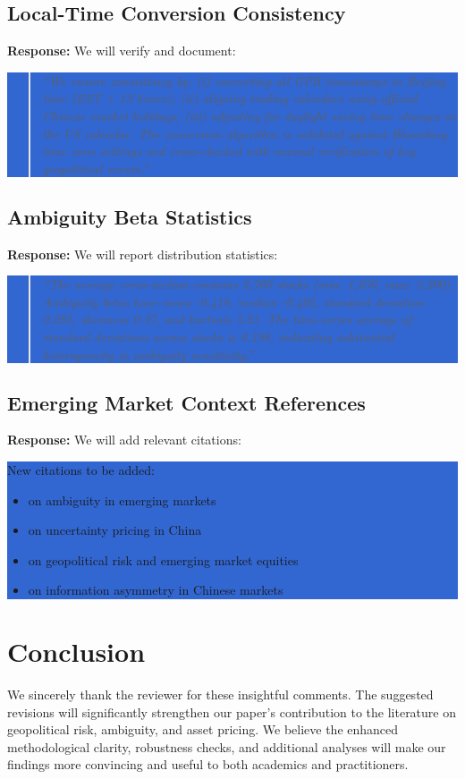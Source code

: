 \documentclass[12pt]{article}
\begin{document}
\subsection*{Local-Time Conversion Consistency}
\textbf{Response:} We will verify and document:

\colorbox{highlight}{\parbox{\dimexpr\linewidth-2\fboxsep}{%
\begin{quote}
\textit{``We ensure consistency by: (i) converting all GPR timestamps to Beijing time (EST + 13 hours); (ii) aligning trading calendars using official Chinese market holidays; (iii) adjusting for daylight saving time changes in the US calendar. The conversion algorithm is validated against Bloomberg time zone settings and cross-checked with manual verification of key geopolitical events.''}
\end{quote}
}}

\subsection*{Ambiguity Beta Statistics}
\textbf{Response:} We will report distribution statistics:

\colorbox{highlight}{\parbox{\dimexpr\linewidth-2\fboxsep}{%
\begin{quote}
\textit{``The average cross-section contains 2,700 stocks (min: 1,850, max: 3,200). Ambiguity betas have mean -0.418, median -0.402, standard deviation 0.285, skewness 0.37, and kurtosis 3.21. The time-series average of standard deviations across stocks is 0.198, indicating substantial heterogeneity in ambiguity sensitivity.''}
\end{quote}
}}

\subsection*{Emerging Market Context References}
\textbf{Response:} We will add relevant citations:

\colorbox{highlight}{\parbox{\dimexpr\linewidth-2\fboxsep}{%
New citations to be added:
\begin{itemize}
\item \citet{Bekaert2014} on ambiguity in emerging markets
\item \citet{Bali2020} on uncertainty pricing in China
\item \citet{Chen2021} on geopolitical risk and emerging market equities
\item \citet{Luo2022} on information asymmetry in Chinese markets
\end{itemize}
}}

\section*{Conclusion}

We sincerely thank the reviewer for these insightful comments. The suggested revisions will significantly strengthen our paper's contribution to the literature on geopolitical risk, ambiguity, and asset pricing. We believe the enhanced methodological clarity, robustness checks, and additional analyses will make our findings more convincing and useful to both academics and practitioners.
\end{document}
